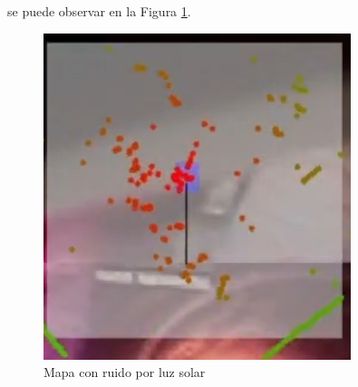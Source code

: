         se puede observar en la Figura \ref{fig:MapaConRuidoLuzSolar}.
    \vskip 0.5cm
    \begin{figure}[htbp]
        \centering
        \includegraphics[width=0.8\textwidth]{./images/Pruebas/robot/MapaConRuidoSolar.png}
        \caption{Mapa con ruido por luz solar}
        \label{fig:MapaConRuidoLuzSolar}
    \end{figure}
    \clearpage
